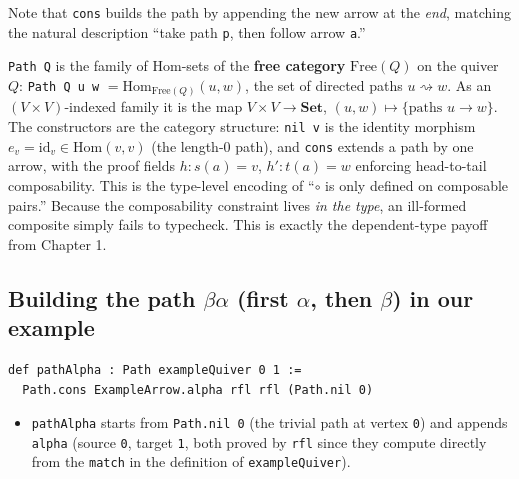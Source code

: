 Note that \texttt{cons} builds the path by appending the new arrow at the \emph{end}, matching the natural description ``take path \texttt{p}, then follow arrow \texttt{a}.''

\begin{mathreading}

\texttt{Path Q} is the family of Hom-sets of the \textbf{free category} \(\mathrm{Free}(Q)\) on the quiver \(Q\): \texttt{Path Q u w} \(=
\mathrm{Hom}_{\mathrm{Free}(Q)}(u, w)\), the set of directed paths \(u
\rightsquigarrow w\). As an \((V\times V)\)-indexed family it is the map \(V \times V \to \mathbf{Set}\), \((u,w) \mapsto \{\text{paths } u \to w\}\). The constructors are the category structure: \texttt{nil v} is the identity morphism \(e_v = \mathrm{id}_v \in \mathrm{Hom}(v,v)\) (the length-\(0\) path), and \texttt{cons} extends a path by one arrow, with the proof fields \(h : s(a) = v\), \(h' : t(a) = w\) enforcing head-to-tail composability. This is the type-level encoding of ``\(\circ\) is only defined on composable pairs.'' Because the composability constraint lives \emph{in the type}, an ill-formed composite simply fails to typecheck. This is exactly the dependent-type payoff from Chapter 1.

\end{mathreading}

\subsection{\texorpdfstring{Building the path \(\beta\alpha\) (first \(\alpha\), then \(\beta\)) in our example}{Building the path \textbackslash beta\textbackslash alpha (first \textbackslash alpha, then \textbackslash beta) in our example}}\label{sec:12-path-algebras:04-paths-as-inductive-type:2}

\begin{lstlisting}
def pathAlpha : Path exampleQuiver 0 1 :=
  Path.cons ExampleArrow.alpha rfl rfl (Path.nil 0)
\end{lstlisting}

\begin{itemize}
\tightlist
\item
  \texttt{pathAlpha} starts from \texttt{Path.nil 0} (the trivial path at vertex \texttt{0}) and appends \texttt{alpha} (source \texttt{0}, target \texttt{1}, both proved by \texttt{rfl} since they compute directly from the \texttt{match} in the definition of \texttt{exampleQuiver}).
\end{itemize}

